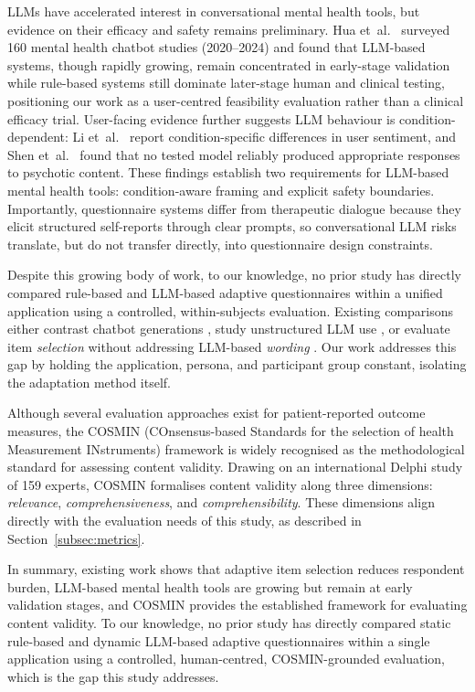 \documentclass[conference]{IEEEtran}
\begin{document}
LLMs have accelerated interest in conversational mental health tools,
but evidence on their efficacy and safety remains preliminary. Hua et~al.\
\cite{hua2025} surveyed 160 mental health chatbot studies (2020--2024)
and found that LLM-based systems, though rapidly growing, remain
concentrated in early-stage validation while rule-based systems still
dominate later-stage human and clinical testing, positioning our work
as a user-centred feasibility evaluation rather than a clinical efficacy
trial. User-facing evidence further suggests LLM behaviour is
condition-dependent: Li et~al.\ \cite{li2025llm} report
condition-specific differences in user sentiment, and Shen et~al.\
\cite{shen2026} found that no tested model reliably produced appropriate
responses to psychotic content. These findings establish two requirements
for LLM-based mental health tools: condition-aware framing and explicit
safety boundaries. Importantly, questionnaire systems differ from
therapeutic dialogue because they elicit structured self-reports through clear
prompts, so conversational LLM risks translate, but do not transfer
directly, into questionnaire design constraints.

Despite this growing body of work, to our knowledge, no prior study has directly compared
rule-based and LLM-based adaptive questionnaires within a unified
application using a controlled, within-subjects evaluation. Existing
comparisons either contrast chatbot generations \cite{hua2025}, study
unstructured LLM use \cite{li2025llm}, or evaluate item \emph{selection}
without addressing LLM-based \emph{wording} \cite{gibbons2008,
choi2010}. Our work addresses this gap by holding the application,
persona, and participant group constant, isolating the adaptation method
itself.

Although several evaluation approaches exist for patient-reported outcome
measures, the COSMIN (COnsensus-based Standards for the selection of health
Measurement INstruments) framework \cite{terwee2018} is widely recognised as
the methodological standard for assessing content validity. Drawing on an
international Delphi study of 159 experts, COSMIN formalises content validity
along three dimensions: \emph{relevance}, \emph{comprehensiveness}, and
\emph{comprehensibility}. These dimensions align directly with the evaluation
needs of this study, as described in Section~\ref{subsec:metrics}.

In summary, existing work shows that adaptive item selection reduces
respondent burden, LLM-based mental health tools are growing but remain
at early validation stages, and COSMIN provides the established framework
for evaluating content validity. To our knowledge, no prior study has directly
compared static rule-based and dynamic LLM-based adaptive questionnaires
within a single application using a controlled, human-centred,
COSMIN-grounded evaluation, which is the gap this study addresses.
\end{document}
